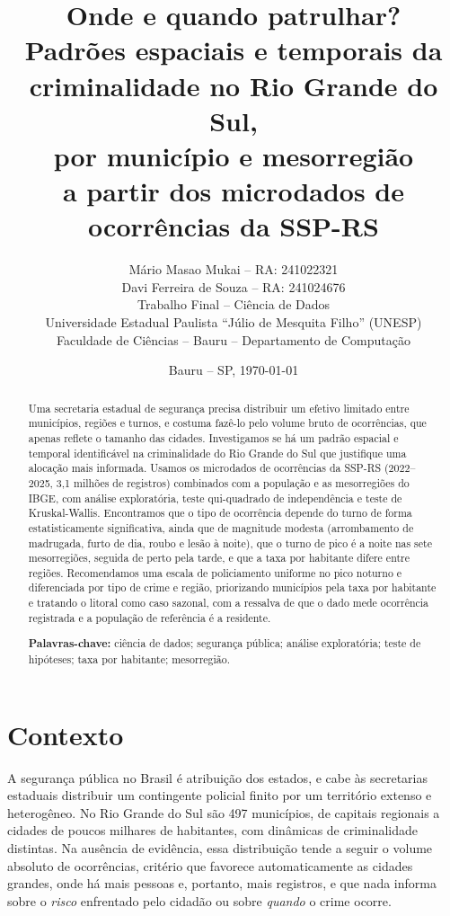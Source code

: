 \documentclass[a4paper,11pt]{article}
\title{\textbf{Onde e quando patrulhar?}\\[2mm]
\large Padrões espaciais e temporais da criminalidade no Rio Grande do Sul,\\
por município e mesorregião\\
\normalsize a partir dos microdados de ocorrências da SSP-RS}
\author{
Mário Masao Mukai -- RA: 241022321\\
Davi Ferreira de Souza -- RA: 241024676\\[2mm]
\small Trabalho Final -- Ciência de Dados\\
\small Universidade Estadual Paulista ``Júlio de Mesquita Filho'' (UNESP)\\
\small Faculdade de Ciências -- Bauru -- Departamento de Computação
}
\date{Bauru -- SP, \today}
\begin{document}
\maketitle

\begin{abstract}
\noindent
Uma secretaria estadual de segurança precisa distribuir um efetivo limitado
entre municípios, regiões e turnos, e costuma fazê-lo pelo volume bruto de
ocorrências, que apenas reflete o tamanho das cidades. Investigamos se há um
padrão espacial e temporal identificável na criminalidade do Rio Grande do Sul
que justifique uma alocação mais informada. Usamos os microdados de ocorrências
da SSP-RS (2022--2025, 3,1 milhões de registros) combinados com a população e as
mesorregiões do IBGE, com análise exploratória, teste qui-quadrado de
independência e teste de Kruskal-Wallis. Encontramos que o tipo de ocorrência
depende do turno de forma estatisticamente significativa, ainda que de magnitude
modesta (arrombamento de madrugada, furto de dia, roubo e lesão à noite), que o
turno de pico é a noite nas sete mesorregiões, seguida de perto pela tarde, e que
a taxa por habitante difere entre regiões. Recomendamos uma escala de policiamento uniforme no pico noturno e
diferenciada por tipo de crime e região, priorizando municípios pela taxa por
habitante e tratando o litoral como caso sazonal, com a ressalva de que o dado
mede ocorrência registrada e a população de referência é a residente.

\vspace{2mm}
\noindent\textbf{Palavras-chave:} ciência de dados; segurança pública;
análise exploratória; teste de hipóteses; taxa por habitante; mesorregião.
\end{abstract}

\section{Contexto}\label{sec:contexto}
A segurança pública no Brasil é atribuição dos estados, e cabe às secretarias
estaduais distribuir um contingente policial finito por um território extenso e
heterogêneo. No Rio Grande do Sul são 497 municípios, de capitais regionais a
cidades de poucos milhares de habitantes, com dinâmicas de criminalidade
distintas. Na ausência de evidência, essa distribuição tende a seguir o volume
absoluto de ocorrências, critério que favorece automaticamente as cidades
grandes, onde há mais pessoas e, portanto, mais registros, e que nada informa
sobre o \emph{risco} enfrentado pelo cidadão ou sobre \emph{quando} o crime
ocorre.
\end{document}
